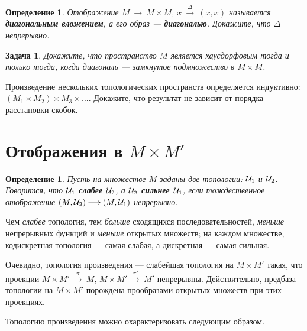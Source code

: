 \documentclass[12pt]{book}
\newcommand{\arrow}{{\:\longrightarrow\:}}
\theoremstyle{upshape}
\newtheorem{zadacha}{Задача}[chapter]
\theoremstyle{generic}
\newtheorem{opredelenie}[teorema]{Определение}
\newtheorem{remark}[teorema]{Замечание}
\def\замечание{\begin{remark}}
\def\еза{\end{remark}}
\theoremstyle{upshapenonumber}
\newcommand{\следствие}{%
     \refstepcounter{teorema}
     {\noindent\bf Следствие \thechapter.\arabic{teorema}:\ }}
\newcommand{\пример}{%
     \refstepcounter{teorema}
     {\noindent\bf Пример \thechapter.\arabic{teorema}:\ }}
\newcommand{\лемма}{%
     \refstepcounter{teorema}
     {\noindent\bf Лемма \thechapter.\arabic{teorema}:\ }}
\newcommand{\теорема}{%
     \refstepcounter{teorema}
     {\noindent\bf Теорема \thechapter.\arabic{teorema}:\ }}
\newcommand{\утверждение}{%
     \refstepcounter{teorema}
     {\noindent\bf Утверждение \thechapter.\arabic{teorema}:\ }}
\def\хфилл{\hfill}
\def\бф{\bf}
\def\ем{\em}
\def\задача{\begin{zadacha}}
\def\ез{\end{zadacha}}
\def\еу{\end{ukazanie}}
\def\определение{\begin{opredelenie}}
\def\ео{\end{opredelenie}}
\def\енум{\begin{enumerate}}
\def\ее{\end{enumerate}}
\begin{document}
\определение
Отображение $M \arrow M\times M$, $x\stackrel \Delta \arrow (x,x)$
называется {\бф диагональным вложением}, а его
образ --- {\бф диагональю}. Докажите, что $\Delta$ непрерывно.
\ео

\задача
Докажите, что пространство $M$ является
хаусдорфовым тогда и только тогда, когда 
диагональ --- замкнутое подмножество в $M \times M$.
\ез

Произведение нескольких топологических пространств
определяется индуктивно:
$(M_1\times M_2)\times M_3\times ...$.
Докажите, что результат не зависит от порядка
расстановки скобок. 


\section{Отображения в $M\times M'$}



\определение
Пусть на множестве $M$ заданы две топологии: ${\cal U}_1$
и ${\cal U}_2$. Говорится, что {\бф ${\cal U}_1$ слабее
  ${\cal U}_2$}, а {\bf ${\cal U}_2$ сильнее ${\cal U}_1$},
если тождественное отображение $(M, {\cal U}_2) \arrow (M,
{\cal U}_1)$
непрерывно.
\ео


Чем {\ем слабее} топология, тем {\ем больше} 
сходящихся последовательностей, {\ем меньше}
непрерывных функций и {\ем меньше} открытых множеств;
на каждом множестве, кодискретная топология --- самая слабая,
а дискретная --- самая сильная.

Очевидно, топология произведения --- слабейшая 
топология на $M\times M'$ такая, что проекции
$M\times M'\stackrel \pi\arrow M$, $M\times M'\stackrel {\pi'}\arrow M'$
непрерывны. Действительно, предбаза топологии
на $M\times M'$ порождена прообразами
открытых множеств при этих проекциях.

Топологию произведения можно охарактеризовать следующим
образом.

\хфилл
\end{document}

